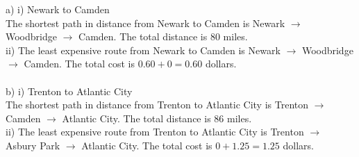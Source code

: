 \documentclass[12pt]{exam}
\begin{document}
\begin{solution}
	a) i) Newark to Camden\\
	The shortest path in distance from Newark to Camden is Newark $\rightarrow$ Woodbridge $\rightarrow$ Camden. The total distance is 80 miles.\\
	ii)
	The least expensive route from Newark to Camden is Newark $\rightarrow$ Woodbridge $\rightarrow$ Camden. The total cost is $0.60+0=0.60$ dollars.\\
	\\b) i) Trenton to Atlantic City\\
	The shortest path in distance from Trenton to Atlantic City is Trenton $\rightarrow$ Camden $\rightarrow$ Atlantic City. The total distance is 86 miles.\\
	ii) The least expensive route from Trenton to Atlantic City is Trenton $\rightarrow$ Asbury Park $\rightarrow$ Atlantic City. The total cost is $0+1.25=1.25$ dollars.
\end{solution}

\newpage
\end{document}
